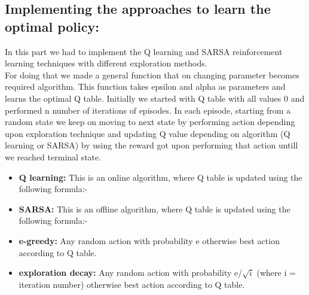 \documentclass{article}
\begin{document}
\begin{enumerate}[a)]
\subsection{Implementing the approaches to learn the optimal policy:}
In this part we had to implement the Q learning and SARSA reinforcement learning techniques with different exploration methods.\\
For doing that we made a general function that on changing parameter becomes required algorithm. This function takes epsilon and alpha as
parameters and learns the optimal Q table. Initially we started with Q table with all values 0 and performed n number of iterations of episodes. In 
each episode, starting from a random state we keep on moving to next state by performing action depending upon exploration technique and updating Q value depending on
algorithm (Q learning or SARSA) by using the reward got upon performing that action untill we reached terminal state. 
\begin{itemize}
    \item \textbf{Q learning: }  This is an online algorithm, where Q table is updated using the following formula:- 
        $ $
    \item \textbf{SARSA: }  This is an offline algorithm, where Q table is updated using the following formula:- 
        $ $
\end{itemize}

\begin{itemize}
    \item \textbf{e-greedy: } Any random action with probability e otherwise best action according to Q table.
    \item \textbf{exploration decay: } Any random action with probability e/$\sqrt{i}$ (where i = iteration number) otherwise best action according to Q table.
\end{itemize}


\end{enumerate}
\end{document}
